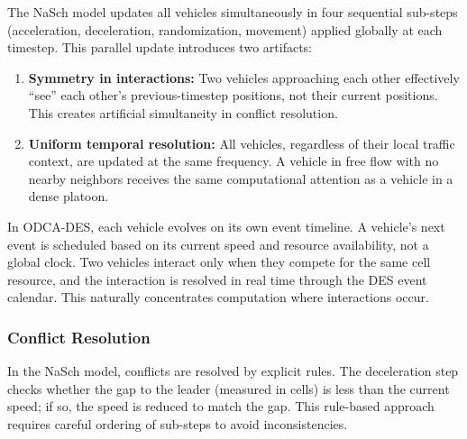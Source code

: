 \documentclass[review,number]{elsarticle}
\begin{document}
The NaSch model updates all vehicles simultaneously in four sequential sub-steps (acceleration, deceleration, randomization, movement) applied globally at each timestep. This parallel update introduces two artifacts:
\begin{enumerate}
    \item \textbf{Symmetry in interactions:} Two vehicles approaching each other effectively ``see'' each other's previous-timestep positions, not their current positions. This creates artificial simultaneity in conflict resolution.
    \item \textbf{Uniform temporal resolution:} All vehicles, regardless of their local traffic context, are updated at the same frequency. A vehicle in free flow with no nearby neighbors receives the same computational attention as a vehicle in a dense platoon.
\end{enumerate}

In ODCA-DES, each vehicle evolves on its own event timeline. A vehicle's next event is scheduled based on its current speed and resource availability, not a global clock. Two vehicles interact only when they compete for the same cell resource, and the interaction is resolved in real time through the DES event calendar. This naturally concentrates computation where interactions occur.

\subsubsection{Conflict Resolution}

In the NaSch model, conflicts are resolved by explicit rules. The deceleration step checks whether the gap to the leader (measured in cells) is less than the current speed; if so, the speed is reduced to match the gap. This rule-based approach requires careful ordering of sub-steps to avoid inconsistencies.
\end{document}
